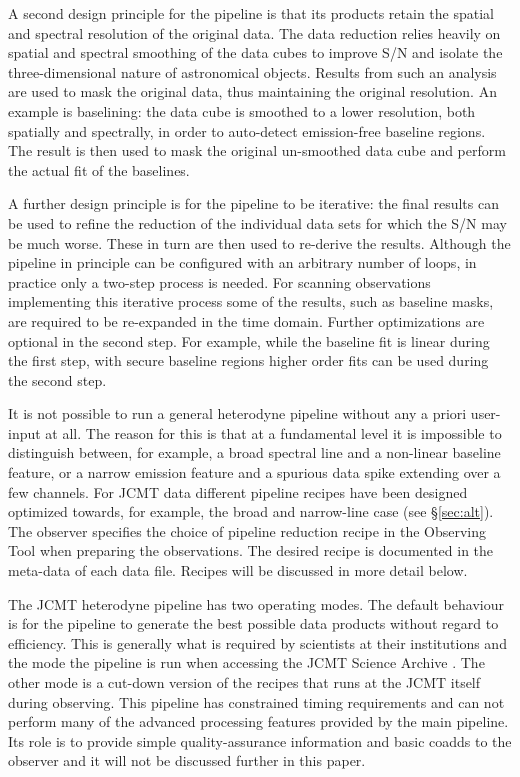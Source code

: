 \documentclass[useAMS,usenatbib]{mn2e}
\begin{document}
A second design principle for the pipeline is that its products
retain the spatial and spectral resolution of the original data.  The
data reduction relies heavily on spatial and spectral smoothing of the
data cubes to improve S/N and isolate the three-dimensional nature of astronomical
objects. Results from such an analysis are used to mask the original
data, thus maintaining the original resolution. An example is
baselining: the data cube is smoothed to a lower resolution,
both spatially and spectrally, in order to auto-detect emission-free
baseline regions. The result is then used to mask the original
un-smoothed data cube and perform the actual fit of the baselines.

A further design principle is for the pipeline to be iterative: the
final results can be used to refine the reduction of the individual data
sets for which the S/N may be much worse. These in turn are then used
to re-derive the results. Although the pipeline in principle can be
configured with an arbitrary number of loops, in practice only a
two-step process is needed. For scanning observations implementing
this iterative process some of the results, such as baseline masks,
are required to be re-expanded in the time domain. Further optimizations are optional in
the second step. For example, while the baseline fit is linear
during the first step, with secure baseline regions higher order fits
can be used during the second step.

It is not possible to run a general heterodyne pipeline without any a
priori user-input at all. The reason for this is that at a fundamental
level it is impossible to distinguish between, for example, a broad spectral
line and a non-linear baseline feature, or a narrow emission feature
and a spurious data spike extending over a few channels. For JCMT data
different pipeline recipes have been designed optimized towards,
for example, the broad and narrow-line case (see \S\ref{sec:alt}). The observer specifies the choice
of pipeline reduction recipe in the Observing Tool when preparing the
observations. The desired recipe is documented in the meta-data of
each data file. Recipes will be discussed in more detail below.

The JCMT heterodyne pipeline has two operating modes. The default
behaviour is for the pipeline to generate the best possible data
products without regard to efficiency. This is generally what is
required by scientists at their institutions and the mode the pipeline is run
when accessing the JCMT Science Archive
\citep[JSA;][]{2015Economou,2008ASPC..394..565J}. The other mode is a
cut-down version of the recipes that runs at the JCMT itself during
observing. This pipeline has constrained timing requirements and can
not perform many of the advanced processing features provided by the
main pipeline. Its role is to provide simple quality-assurance
information and basic coadds to the observer and it will not be
discussed further in this paper.
\end{document}
